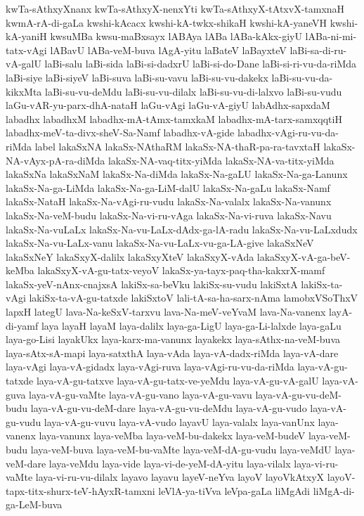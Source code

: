 {kwTa-sAthxyXnanx
kwTa-sAthxyX-nenxYti
kwTa-sAthxyX-tAtxvX-tamxnaH
kwmA-rA-di-gaLa
kwshi-kAcacx
kwshi-kA-twkx-shikaH
kwshi-kA-yaneVH
kwshi-kA-yaniH
kwsuMBa
kwsu-maBxsayx
lABAya
lABa
lABa-kAkx-giyU
lABa-ni-mi-tatx-vAgi
lABavU
lABa-veM-buva
lAgA-yitu
laBateV
laBayxteV
laBi-sa-di-ru-vA-galU
laBi-salu
laBi-sida
laBi-si-dadxrU
laBi-si-do-Dane
laBi-si-ri-vu-da-riMda
laBi-siye
laBi-siyeV
laBi-suva
laBi-su-vavu
laBi-su-vu-dakekx
laBi-su-vu-da-kikxMta
laBi-su-vu-deMdu
laBi-su-vu-dilalx
laBi-su-vu-di-lalxvo
laBi-su-vudu
laGu-vAR-yu-parx-dhA-nataH
laGu-vAgi
laGu-vA-giyU
labAdhx-sapxdaM
labadhx
labadhxM
labadhx-mA-tAmx-tamxkaM
labadhx-mA-tarx-samxqqtiH
labadhx-meV-ta-divx-sheV-Sa-Namf
labadhx-vA-gide
labadhx-vAgi-ru-vu-da-riMda
label
lakaSxNA
lakaSx-NAthaRM
lakaSx-NA-thaR-pa-ra-tavxtaH
lakaSx-NA-vAyx-pA-ra-diMda
lakaSx-NA-vaq-titx-yiMda
lakaSx-NA-va-titx-yiMda
lakaSxNa
lakaSxNaM
lakaSx-Na-diMda
lakaSx-Na-gaLU
lakaSx-Na-ga-Lanunx
lakaSx-Na-ga-LiMda
lakaSx-Na-ga-LiM-dalU
lakaSx-Na-gaLu
lakaSx-Namf
lakaSx-NataH
lakaSx-Na-vAgi-ru-vudu
lakaSx-Na-valalx
lakaSx-Na-vanunx
lakaSx-Na-veM-budu
lakaSx-Na-vi-ru-vAga
lakaSx-Na-vi-ruva
lakaSx-Navu
lakaSx-Na-vuLaLx
lakaSx-Na-vu-LaLx-dAdx-ga-lA-radu
lakaSx-Na-vu-LaLxdudx
lakaSx-Na-vu-LaLx-vanu
lakaSx-Na-vu-LaLx-vu-ga-LA-give
lakaSxNeV
lakaSxNeY
lakaSxyX-dalilx
lakaSxyXteV
lakaSxyX-vAda
lakaSxyX-vA-ga-beV-keMba
lakaSxyX-vA-gu-tatx-veyoV
lakaSx-ya-tayx-paq-tha-kakxrX-mamf
lakaSx-yeV-nAnx-cnajxsA
lakiSx-sa-beVku
lakiSx-su-vudu
lakiSxtA
lakiSx-ta-vAgi
lakiSx-ta-vA-gu-tatxde
lakiSxtoV
lali-tA-sa-ha-sarx-nAma
lamobxVSoThxV
lapxH
lategU
lava-Na-keSxV-tarxvu
lava-Na-meV-veYvaM
lava-Na-vanenx
layA-di-yamf
laya
layaH
layaM
laya-dalilx
laya-ga-LigU
laya-ga-Li-lalxde
laya-gaLu
laya-go-Lisi
layakUkx
laya-karx-ma-vanunx
layakekx
laya-sAthx-na-veM-buva
laya-sAtx-sA-mapi
laya-satxthA
laya-vAda
laya-vA-dadx-riMda
laya-vA-dare
laya-vAgi
laya-vA-gidadx
laya-vAgi-ruva
laya-vAgi-ru-vu-da-riMda
laya-vA-gu-tatxde
laya-vA-gu-tatxve
laya-vA-gu-tatx-ve-yeMdu
laya-vA-gu-vA-galU
laya-vA-guva
laya-vA-gu-vaMte
laya-vA-gu-vano
laya-vA-gu-vavu
laya-vA-gu-vu-deM-budu
laya-vA-gu-vu-deM-dare
laya-vA-gu-vu-deMdu
laya-vA-gu-vudo
laya-vA-gu-vudu
laya-vA-gu-vuvu
laya-vA-vudo
layavU
laya-valalx
laya-vanUnx
laya-vanenx
laya-vanunx
laya-veMba
laya-veM-bu-dakekx
laya-veM-budeV
laya-veM-budu
laya-veM-buva
laya-veM-bu-vaMte
laya-veM-dA-gu-vudu
laya-veMdU
laya-veM-dare
laya-veMdu
laya-vide
laya-vi-de-yeM-dA-yitu
laya-vilalx
laya-vi-ru-vaMte
laya-vi-ru-vu-dilalx
layavo
layavu
layeV-neYva
layoV
layoVkAtxyX
layoV-tapx-titx-shurx-teV-hAyxR-tamxni
leVlA-ya-tiVva
leVpa-gaLa
liMgAdi
liMgA-di-ga-LeM-buva
}
